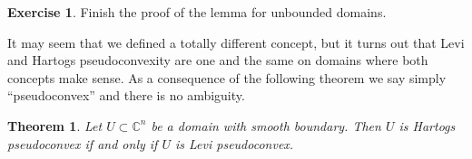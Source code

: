 \documentclass[12pt,openany]{book}
\newcommand{\C}{{\mathbb{C}}}
\theoremstyle{plain}
\newtheorem{thm}{Theorem}[section]
\theoremstyle{remark}
\theoremstyle{definition}
\newenvironment{exbox}{%
    \def\FrameCommand{\vrule width 1pt \relax\hspace {10pt}}%
    \MakeFramed {\advance \hsize -\width \FrameRestore }%
}{%
    \endMakeFramed
}
\theoremstyle{exercise}
\newtheorem{exercise}{Exercise}[section]
\theoremstyle{example}
\begin{document}
\begin{exbox}
\begin{exercise}
Finish the proof of the lemma for unbounded domains.
\pagebreak[2]
\end{exercise}
\end{exbox}



It may seem that we defined a totally different concept, but it turns
out that Levi and Hartogs pseudoconvexity are one and the same on domains
where both concepts make sense.
As a consequence of the following theorem we say simply ``pseudoconvex'' and there
is no ambiguity.

\begin{thm}
Let $U \subset \C^n$ be a domain with smooth boundary. 
Then $U$ is Hartogs pseudoconvex if and only if $U$ is Levi pseudoconvex.
\end{thm}
\end{document}
